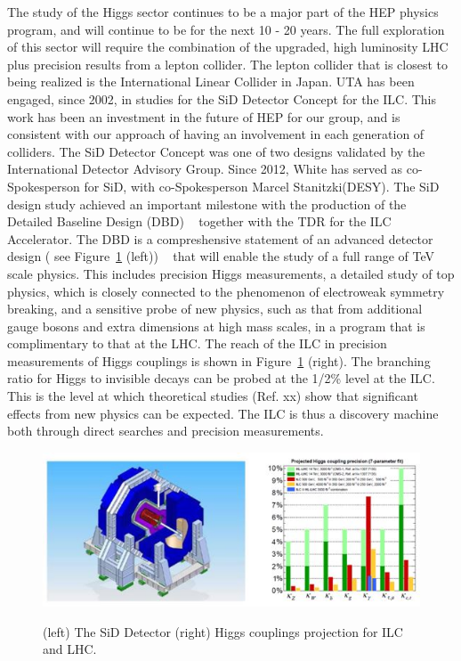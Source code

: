 The study of the Higgs sector continues to be a major part of the HEP physics program, and will continue to be for 
the next 10 - 20 years.
The full exploration of this sector will require the combination of the upgraded, high luminosity LHC plus precision
results from a lepton collider. The lepton collider that is closest to being realized is the International Linear Collider
in Japan. UTA has been engaged, since 2002, in studies for the SiD Detector Concept for the ILC. 
This work has been an investment in the future of HEP for our group, and is 
consistent with our approach of having an involvement in each generation of colliders. The SiD Detector Concept
was one of two designs validated by the International Detector Advisory Group.
Since 2012, White has served as co-Spokesperson for SiD, with co-Spokesperson Marcel Stanitzki(DESY).
The SiD design study achieved an important milestone with the production of the Detailed Baseline 
Design (DBD) ~\cite{SiDDBD} together with the TDR for the ILC Accelerator. 
The DBD is a compreshensive statement of an advanced detector design ( see Figure~\ref{fig:SiD_Detector} (left)) ~\cite{SiDDet} that will
enable the study of a full range of TeV scale physics. This includes precision Higgs 
measurements, a detailed study of top physics, which is closely connected to the
phenomenon of electroweak symmetry breaking, and a sensitive probe of new physics, such as that from 
additional gauge bosons and extra dimensions at high mass scales, in a program that is complimentary
to that at the LHC. The reach of the ILC in precision measurements of Higgs couplings is shown in 
Figure~\ref{fig:SiD_Detector} (right). The branching ratio for Higgs to invisible decays can be probed at the 1/2\% level 
at the ILC. This is the level at which theoretical studies (Ref. xx) show that significant effects from new physics can be expected.
The ILC is thus a discovery machine both through direct searches and precision measurements.

\begin{figure}[htb]
\centering

      \includegraphics[scale=0.8]{images/SiD_Detector_ILC_Higgs.JPG}
      \label{fig:SiD_Detector}

\caption{(left) The SiD Detector (right) Higgs couplings projection for ILC and LHC.}
\end{figure}

